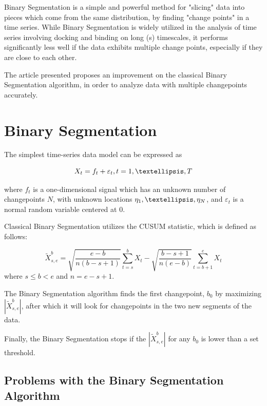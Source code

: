 \documentclass[%
 reprint,
 amsmath,amssymb,
 aps,
]{revtex4-1}
\begin{document}
Binary Segmentation is a simple and powerful method for "slicing" data into pieces which come from the same distribution, by finding "change points" in a time series.
While Binary Segmentation is widely utilized in the analysis of time series involving docking and binding on long (s) timescales, it performs significantly less well if the data exhibits multiple change points, especially if they are close to each other.

The article presented proposes an improvement on the classical Binary Segmentation algorithm, in order to analyze data with multiple changepoints accurately.

\section{Binary Segmentation}
The simplest time-series data model can be expressed as

\[X_t = f_t+\varepsilon_t,  t = 1, \textellipsis,T  \]

where \(f_t\) is a one-dimensional signal which has an unknown number of changepoints  \(N\), with unknown locations  \(\eta_1, \textellipsis, \eta_N\), and  \(\varepsilon_t\) is a normal random variable centered at 0.

Classical Binary Segmentation utilizes the CUSUM statistic, which is defined as follows:

\[
\tilde{X}^{b}_{s,e} = \sqrt{\frac{e - b}{n(b-s+1)}} \sum_{t=s}^{b}X_t - \sqrt{\frac{b-s+1}{n(e - b)}} \sum_{t=b+1}^{e}X_t
\]
where \( s \leq b < e \) and \( n = e - s + 1 \).

The Binary Segmentation algorithm finds the first changepoint, \( b_0\) by maximizing \( |\tilde{X}^{b}_{s,e}| \), after which it will look for changepoints in the two new segments of the data.

Finally, the Binary Segmentation stops if the \( |\tilde{X}^{b}_{s,e}| \) for any \( b_0\) is lower than a set threshold.

\subsection{Problems with the Binary Segmentation Algorithm}
\end{document}
